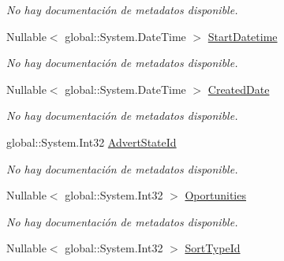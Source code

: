 \begin{DoxyCompactItemize}
\begin{DoxyCompactList}\small\item\em No hay documentación de metadatos disponible. \end{DoxyCompactList}\item 
Nullable$<$ global\-::\-System.\-Date\-Time $>$ \hyperlink{class_microsoft_1_1_samples_1_1_kinect_1_1_basic_interactions_1_1_adverts_a49a03fd75592345c7584bc761b46cf3e}{Start\-Datetime}
\begin{DoxyCompactList}\small\item\em No hay documentación de metadatos disponible. \end{DoxyCompactList}\item 
Nullable$<$ global\-::\-System.\-Date\-Time $>$ \hyperlink{class_microsoft_1_1_samples_1_1_kinect_1_1_basic_interactions_1_1_adverts_ad67ed8fbe03af0fc7edd8806a5c74e15}{Created\-Date}
\begin{DoxyCompactList}\small\item\em No hay documentación de metadatos disponible. \end{DoxyCompactList}\item 
global\-::\-System.\-Int32 \hyperlink{class_microsoft_1_1_samples_1_1_kinect_1_1_basic_interactions_1_1_adverts_adc15ed6d0864a4bc1be9d2d311e05ab1}{Advert\-State\-Id}
\begin{DoxyCompactList}\small\item\em No hay documentación de metadatos disponible. \end{DoxyCompactList}\item 
Nullable$<$ global\-::\-System.\-Int32 $>$ \hyperlink{class_microsoft_1_1_samples_1_1_kinect_1_1_basic_interactions_1_1_adverts_acdef349135cf4650eb7b48d2af0cbbeb}{Oportunities}
\begin{DoxyCompactList}\small\item\em No hay documentación de metadatos disponible. \end{DoxyCompactList}\item 
Nullable$<$ global\-::\-System.\-Int32 $>$ \hyperlink{class_microsoft_1_1_samples_1_1_kinect_1_1_basic_interactions_1_1_adverts_a7038889daa495680752d091fc01c123d}{Sort\-Type\-Id}

\end{DoxyCompactItemize}
